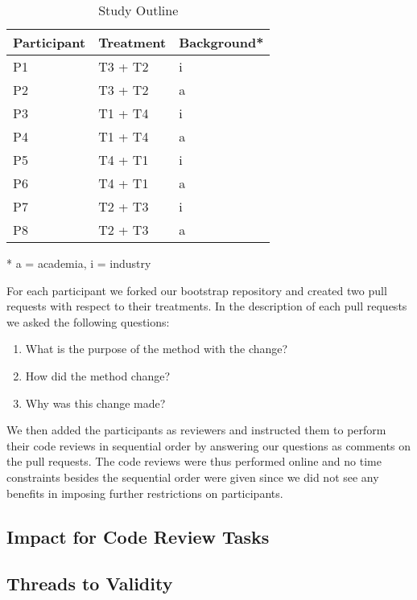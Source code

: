\documentclass[../manifest.tex]{subfiles}
\begin{document}
\begin{table*}[t]
    \label{tab:study-outline}
    \centering
    \begin{threeparttable}
    \begin{tabular*}{\textwidth}{lll}
    \hline
    \textbf{Participant} & \textbf{Treatment} & \textbf{Background*} \\
    \hline
    P1 & T3 + T2 & i \\
    P2 & T3 + T2 & a \\
    P3 & T1 + T4 & i \\
    P4 & T1 + T4 & a \\
    P5 & T4 + T1 & i \\
    P6 & T4 + T1 & a \\
    P7 & T2 + T3 & i \\
    P8 & T2 + T3 & a \\
    \hline
    \end{tabular*}
    \begin{tablenotes}\footnotesize
        \item [*] a = academia, i = industry
    \end{tablenotes}
    \end{threeparttable}
    \caption{Study Outline}
\end{table*}

For each participant we forked our bootstrap repository and created two pull requests with respect to their treatments. In the description of each pull requests we asked the following questions:
\begin{enumerate}
  \item What is the purpose of the method with the change?
  \item How did the method change?
  \item Why was this change made?
\end{enumerate}

We then added the participants as reviewers and instructed them to perform their code reviews in sequential order by answering our questions as comments on the pull requests. The code reviews were thus performed online and no time constraints besides the sequential order were given since we did not see any benefits in imposing further restrictions on participants.

\subsection{Impact for Code Review Tasks} \label{eval-impact}

\subsection{Threads to Validity} \label{eval-threats}
\end{document}
